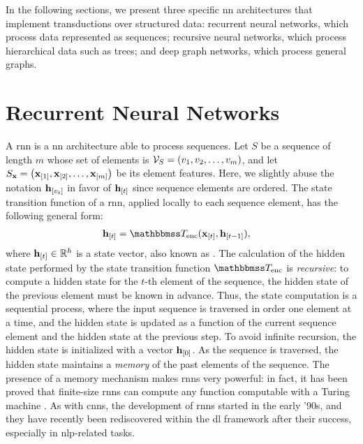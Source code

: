 In the following sections, we present three specific \gls{nn} architectures that implement transductions over structured data: recurrent neural networks, which process data represented as sequences; recursive neural networks, which process hierarchical data such as trees; and deep graph networks, which process general graphs.

\section{Recurrent Neural Networks}\label{sec:rnns}
A \gls{rnn} is a \gls{nn} architecture able to process sequences. Let $S$ be a sequence of length $m$ whose set of elements is $\Cal{V}_S = (v_1, v_2, \ldots, v_m)$, and let $S_{\Vector{x}} = \Seq{\Elem{x}{1}, \Elem{x}{2}, \ldots, \Elem{x}{m}}$ be its element features. Here, we slightly abuse the notation $\Elem{h}{v_t}$ in favor of $\Elem{h}{t}$ since sequence elements are ordered. The state transition function of a \gls{rnn}, applied locally to each sequence element, has the following general form:
\begin{align*}
    \Elem{h}{t} &= \Transduction_{\Fun{enc}}(\Elem{x}{t}, \Elem{h}{t-1}),
\end{align*}
where $\Elem{h}{t} \in \Real^h$ is a state vector, also known as . The calculation of the hidden state performed by the state transition function $\Transduction_{\Fun{enc}}$ is \emph{recursive}: to compute a hidden state for the $t$-th element of the sequence, the hidden state of the previous element must be known in advance. Thus, the state computation is a sequential process, where the input sequence is traversed in order one element at a time, and the hidden state is updated as a function of the current sequence element and the hidden state at the previous step. To avoid infinite recursion, the hidden state is initialized with a vector $\Elem{h}{0}$. As the sequence is traversed, the hidden state maintains a \emph{memory} of the past elements of the sequence. The presence of a memory mechanism makes \glspl{rnn} very powerful: in fact, it has been proved that finite-size \glspl{rnn} can compute any function computable with a Turing machine \cite{?}. As with \glspl{cnn}, the development of \glspl{rnn} started in the early '90s, and they have recently been rediscovered within the \gls{dl} framework after their success, especially in \gls{nlp}-related tasks.

